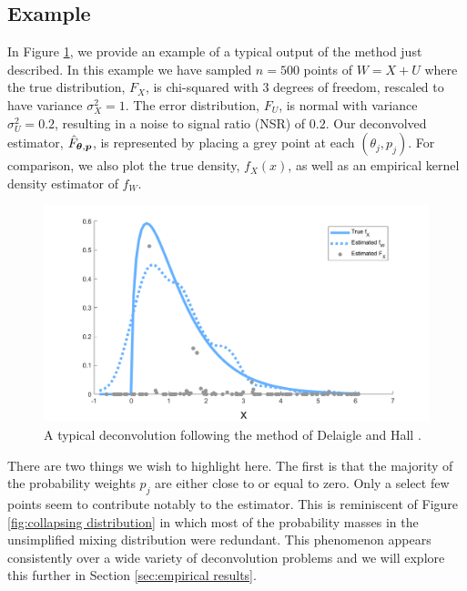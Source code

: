	\subsection{Example}
	In Figure \ref{fig:fixed masses example no smoothing}, we provide an example of a typical output of the method just described. In this example we have sampled $n = 500$ points of $W = X+U$ where the true distribution, $F_X$, is chi-squared with 3 degrees of freedom, rescaled to have variance $\sigma_X^2 = 1$. The error distribution, $F_U$, is normal with variance $\sigma_U^2 = 0.2$, resulting in a noise to signal ratio (NSR) of $0.2$. Our deconvolved estimator, $\hat{F}_{{\bm{{\theta}}}, {\bm{{p}}}}$, is represented by placing a grey point at each $(\theta_j, p_j)$. For comparison, we also plot the true density, $f_X(x)$, as well as an empirical kernel density estimator of $f_W$.

	\begin{figure}[ht]
		\centering
		\includegraphics[width = \textwidth]{Figures/Deconvolution/fixed_masses_example_nosmoothing.png}
		\caption{A typical deconvolution following the method of Delaigle and Hall \cite{Delaigle2016-la}.}
		\label{fig:fixed masses example no smoothing}
	\end{figure}

	There are two things we wish to highlight here. The first is that the majority of the probability weights $p_j$ are either close to or equal to zero. Only a select few points seem to contribute notably to the estimator. This is reminiscent of Figure \ref{fig:collapsing distribution} in which most of the probability masses in the unsimplified mixing distribution were redundant. This phenomenon appears consistently over a wide variety of deconvolution problems and we will explore this further in Section \ref{sec:empirical results}. 

